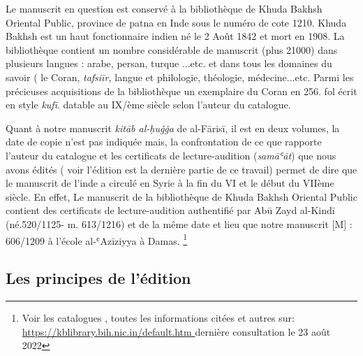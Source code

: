 \documentclass[a4paper,12pt]{report}
\begin{document}
\begin{itemize}
\begin{enumerate}
Le manuscrit en question est conservé à la bibliothèque de  Khuda Bakhsh Oriental Public, province de patna en Inde sous le numéro de cote 1210. Khuda Bakhsh est un haut fonctionnaire indien né le 2 Août 1842 et mort en 1908. 
La bibliothèque contient un nombre considérable  de manuscrit (plus 21000) dans plusieurs langues : arabe, persan, turque ...etc.  et dans tous les domaines du savoir ( le Coran, \textit{tafsi\=ir,} langue et philologie, théologie, médecine...etc. Parmi les précieuses acquisitions de la  bibliothèque un exemplaire du Coran en 256. fol écrit en  style \textit{kuf\=i}. datable au IX/ème siècle selon l'auteur du catalogue. 

Quant à notre manuscrit \textit{kitāb al-ḥuǧǧa }de al-F\=aris\=i, il est en deux volumes, la date de copie n'est pas indiquée mais, la confrontation de ce que rapporte l'auteur du catalogue et les certificats de lecture-audition (\textit{sam\=aʿ\=at}) que nous avons édités ( voir l'édition est la dernière partie de ce travail) permet de dire que le manuscrit de l'inde a circulé en Syrie à la fin du VI et le début du VIIème siècle.  En effet,  Le manuscrit  de  la bibliothèque de  Khuda Bakhsh Oriental Public contient des certificats de lecture-audition authentifié par  Ab\=u Zayd al-Kind\=i (né.520/1125- m. 613/1216)  et  de la même date et lieu que notre  manuscrit [M] :  606/1209 à l’école al-ʿAzīziyya à Damas. \footnote{ Voir les catalogues , toutes les informations citées et autres sur: \url{ https://kblibrary.bih.nic.in/default.htm } dernière consultation le 23 août 2022} 




\newpage
\begin{french}
    

\section{Les principes de l'édition }


\end{french}
\end{enumerate}
\end{itemize}
\end{document}
